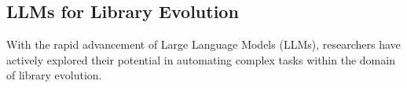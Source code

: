 

\subsection{LLMs for Library Evolution}

With the rapid advancement of Large Language Models (LLMs), researchers have actively explored their potential in automating complex tasks within the domain of library evolution.


